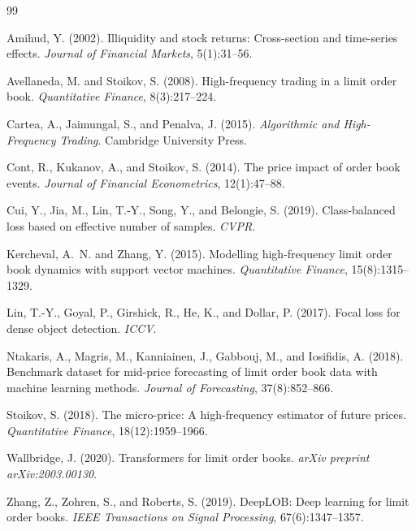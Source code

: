 \documentclass[11pt,a4paper]{article}
\begin{document}

\begin{thebibliography}{99}

Amihud, Y. (2002).
\newblock Illiquidity and stock returns: Cross-section and time-series effects.
\newblock \emph{Journal of Financial Markets}, 5(1):31--56.

Avellaneda, M. and Stoikov, S. (2008).
\newblock High-frequency trading in a limit order book.
\newblock \emph{Quantitative Finance}, 8(3):217--224.

Cartea, A., Jaimungal, S., and Penalva, J. (2015).
\newblock \emph{Algorithmic and High-Frequency Trading}.
\newblock Cambridge University Press.

Cont, R., Kukanov, A., and Stoikov, S. (2014).
\newblock The price impact of order book events.
\newblock \emph{Journal of Financial Econometrics}, 12(1):47--88.

Cui, Y., Jia, M., Lin, T.-Y., Song, Y., and Belongie, S. (2019).
\newblock Class-balanced loss based on effective number of samples.
\newblock \emph{CVPR}.

Kercheval, A.~N. and Zhang, Y. (2015).
\newblock Modelling high-frequency limit order book dynamics with support vector machines.
\newblock \emph{Quantitative Finance}, 15(8):1315--1329.

Lin, T.-Y., Goyal, P., Girshick, R., He, K., and Dollar, P. (2017).
\newblock Focal loss for dense object detection.
\newblock \emph{ICCV}.

Ntakaris, A., Magris, M., Kanniainen, J., Gabbouj, M., and Iosifidis, A. (2018).
\newblock Benchmark dataset for mid-price forecasting of limit order book data with machine learning methods.
\newblock \emph{Journal of Forecasting}, 37(8):852--866.

Stoikov, S. (2018).
\newblock The micro-price: A high-frequency estimator of future prices.
\newblock \emph{Quantitative Finance}, 18(12):1959--1966.

Wallbridge, J. (2020).
\newblock Transformers for limit order books.
\newblock \emph{arXiv preprint arXiv:2003.00130}.

Zhang, Z., Zohren, S., and Roberts, S. (2019).
\newblock DeepLOB: Deep learning for limit order books.
\newblock \emph{IEEE Transactions on Signal Processing}, 67(6):1347--1357.

\end{thebibliography}
\end{document}
